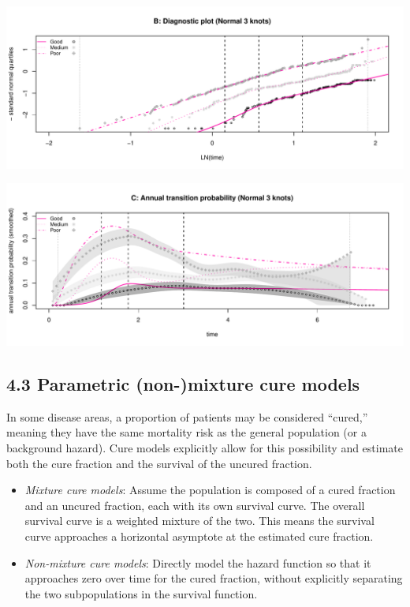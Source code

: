 \documentclass[
]{article}
\providecommand{\tightlist}{%
  \setlength{\itemsep}{0pt}\setlength{\parskip}{0pt}}
\begin{document}
\begin{flushleft}\includegraphics[height=0.25\textheight]{BC_OS_output/Images/Figure_spline_models-26} \end{flushleft}

\begin{flushleft}\includegraphics[height=0.25\textheight]{BC_OS_output/Images/Figure_spline_models-27} \end{flushleft}

\clearpage

\subsection{4.3 Parametric (non-)mixture cure
models}\label{parametric-non-mixture-cure-models}

In some disease areas, a proportion of patients may be considered
``cured,'' meaning they have the same mortality risk as the general
population (or a background hazard). Cure models explicitly allow for
this possibility and estimate both the cure fraction and the survival of
the uncured fraction.

\begin{itemize}
\tightlist
\item
  \emph{Mixture cure models}: Assume the population is composed of a
  cured fraction and an uncured fraction, each with its own survival
  curve. The overall survival curve is a weighted mixture of the two.
  This means the survival curve approaches a horizontal asymptote at the
  estimated cure fraction.\\
\item
  \emph{Non-mixture cure models}: Directly model the hazard function so
  that it approaches zero over time for the cured fraction, without
  explicitly separating the two subpopulations in the survival function.
\end{itemize}
\end{document}
